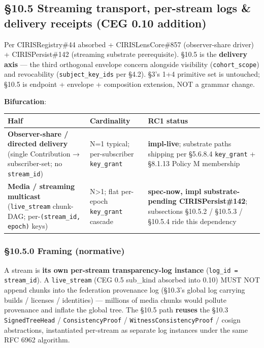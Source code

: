 \documentclass[11pt]{article}
\begin{document}
\subsection*{§10.5 Streaming transport, per-stream logs \& delivery receipts (CEG 0.10 addition)}


Per CIRISRegistry\#44 absorbed + CIRISLensCore\#857 (observer-share driver) + CIRISPersist\#142 (streaming substrate prerequisite). §10.5 is the \textbf{delivery axis} — the third orthogonal envelope concern alongside visibility (\texttt{cohort\_scope}) and revocability (\texttt{subject\_key\_ids} per §4.2). §3's 1+4 primitive set is untouched; §10.5 is endpoint + envelope + composition extension, NOT a grammar change.


\textbf{Bifurcation}:


{\footnotesize
\begin{longtable}{|p{5.33cm}|p{5.33cm}|p{5.33cm}|}\hline
\textbf{Half} & \textbf{Cardinality} & \textbf{RC1 status} \\ \hline\endhead
\textbf{Observer-share / directed delivery} (single Contribution → subscriber-set; no \texttt{stream\_id}) & N=1 typical; per-subscriber \texttt{key\_grant} & \textbf{impl-live}; substrate paths shipping per §5.6.8.4 \texttt{key\_grant} + §8.1.13 Policy M membership \\ \hline
\textbf{Media / streaming multicast} (\texttt{live\_stream} chunk-DAG; per-\texttt{(stream\_id, epoch)} keys) & N>1; flat per-epoch \texttt{key\_grant} cascade & \textbf{spec-now, impl substrate-pending CIRISPersist\#142}; subsections §10.5.2 / §10.5.3 / §10.5.4 ride this dependency \\ \hline
\end{longtable}}


\subsubsection*{§10.5.0 Framing (normative)}


A stream is \textbf{its own per-stream transparency-log instance} (\texttt{log\_id = stream\_id}). A \texttt{live\_stream} (CEG 0.5 sub\_kind absorbed into 0.10) MUST NOT append chunks into the federation provenance log (§10.3's global log carrying builds / licenses / identities) — millions of media chunks would pollute provenance and inflate the global tree. The §10.5 path \textbf{reuses} the §10.3 \texttt{SignedTreeHead} / \texttt{ConsistencyProof} / \texttt{WitnessConsistencyProof} / cosign abstractions, instantiated per-stream as separate log instances under the same RFC 6962 algorithm.
\end{document}
